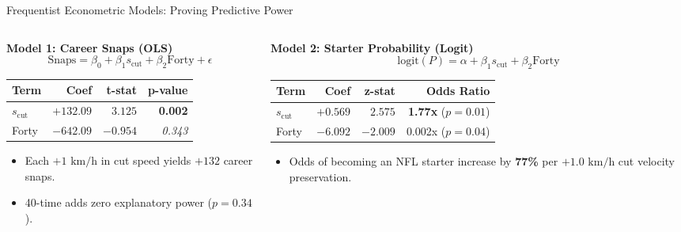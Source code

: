 \documentclass[aspectratio=169, 10pt]{beamer}
\begin{document}
\begin{frame}{Frequentist Econometric Models: Proving Predictive Power}
  \begin{columns}[T]
    \begin{column}{0.5\textwidth}
      \textbf{Model 1: Career Snaps (OLS)}
      $$\text{Snaps} = \beta_0 + \beta_1 s_{\text{cut}} + \beta_2 \text{Forty} + \epsilon$$
      \small
      \begin{tabular}{lrrr}
        \toprule
        \textbf{Term} & \textbf{Coef} & \textbf{t-stat} & \textbf{p-value} \\
        \midrule
        $s_{\text{cut}}$ & $+132.09$ & $3.125$ & \textbf{0.002} \\
        Forty & $-642.09$ & $-0.954$ & \textit{0.343} \\
        \bottomrule
      \end{tabular}
      \normalsize
      \vspace{0.2cm}
      \begin{itemize}
        \footnotesize
        \item Each $+1\text{ km/h}$ in cut speed yields $+132$ career snaps.
        \item 40-time adds zero explanatory power ($p=0.34$).
      \end{itemize}
    \end{column}
    \begin{column}{0.5\textwidth}
      \textbf{Model 2: Starter Probability (Logit)}
      $$\text{logit}(P) = \alpha + \beta_1 s_{\text{cut}} + \beta_2 \text{Forty}$$
      \small
      \begin{tabular}{lrrr}
        \toprule
        \textbf{Term} & \textbf{Coef} & \textbf{z-stat} & \textbf{Odds Ratio} \\
        \midrule
        $s_{\text{cut}}$ & $+0.569$ & $2.575$ & \textbf{1.77x} ($p=0.01$) \\
        Forty & $-6.092$ & $-2.009$ & 0.002x ($p=0.04$) \\
        \bottomrule
      \end{tabular}
      \normalsize
      \vspace{0.2cm}
      \begin{itemize}
        \footnotesize
        \item Odds of becoming an NFL starter increase by \textbf{77\%} per $+1.0\text{ km/h}$ cut velocity preservation.
      \end{itemize}
    \end{column}
  \end{columns}
\end{frame}
\end{document}
